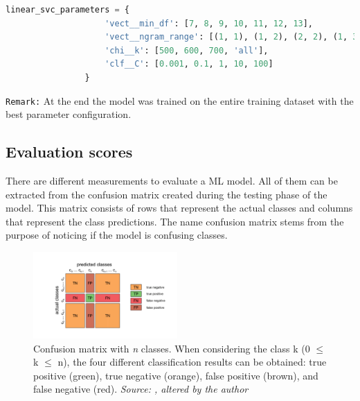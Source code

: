 \begin{lstlisting}[language=Python, caption=Tuned hyperparameters of the linearSVC fitting algorithm, label=codelinearsvcparameters]
linear_svc_parameters = {
                    'vect__min_df': [7, 8, 9, 10, 11, 12, 13],
                    'vect__ngram_range': [(1, 1), (1, 2), (2, 2), (1, 3)],
                    'chi__k': [500, 600, 700, 'all'],
                    'clf__C': [0.001, 0.1, 1, 10, 100]
                }
\end{lstlisting}

\texttt{Remark:} At the end the model was trained on the entire training dataset with the best parameter configuration.\\

\subsection{Evaluation scores} \label{ml_evaluation_scores}
There are different measurements to evaluate a ML model. All of them can be extracted from the confusion matrix created during the testing phase of the model. This matrix consists of rows that represent the actual classes and columns that represent the class predictions. The name confusion matrix stems from the purpose of noticing if the model is confusing classes.

\begin{figure} %
    \centerline{\includegraphics[trim={0 0 0 0},clip,width=0.49\textwidth]{img/Confusion_matrix_edited}}
  \caption{Confusion matrix with \textit{n} classes. When considering the class k (0 $\le$ k $\le$ n), the four different classification results can be obtained: true positive (green), true negative (orange), false positive (brown), and false negative (red). \textit{Source: \parencite{Kruger2018}, altered by the author}}
  \label{fig:confusion_matrix_illustration}
\end{figure}

